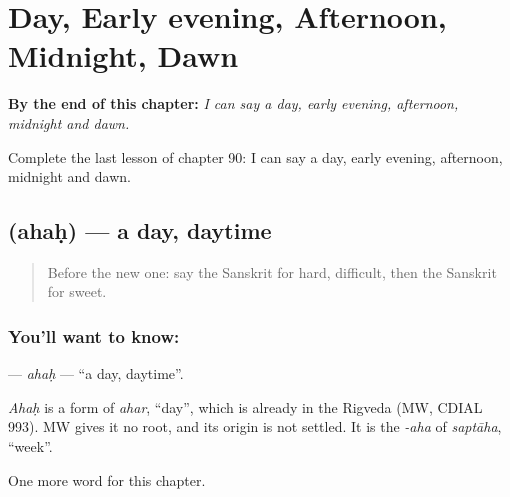 
\chapter{Day, Early evening, Afternoon, Midnight, Dawn}
\label{ch:sa-day-early-evening-afternoon-midnight-dawn}

\begin{chapteropening}
\textbf{By the end of this chapter:} \emph{I can say a day, early evening, afternoon, midnight and dawn.}

Complete the last lesson of chapter 90: I can say a day, early evening, afternoon, midnight and dawn.
\end{chapteropening}

\section[\texorpdfstring{\sk{अहः} (ahaḥ)}{अहः (ahaḥ)}]{ (ahaḥ) — a day, daytime}

\label{lesson:SA-C90-ahah}



\begin{quote}
Before the new one: say the Sanskrit for hard, difficult, then the Sanskrit for sweet.
\end{quote}

\subsection*{You'll want to know: }
\textbf{} — \emph{ahaḥ} — \textquotedblleft{}a day, daytime\textquotedblright{}.

\begin{cousinweb}
\emph{Ahaḥ} is a form of \emph{ahar}, \textquotedblleft{}day\textquotedblright{}, which is already in the Rigveda (MW, CDIAL 993). MW gives it no root, and its origin is not settled. It is the \emph{-aha} of \emph{saptāha}, \textquotedblleft{}week\textquotedblright{}.
\end{cousinweb}

\begin{grammarlens}[title={What you've built}]
One more word for this chapter.
\end{grammarlens}

